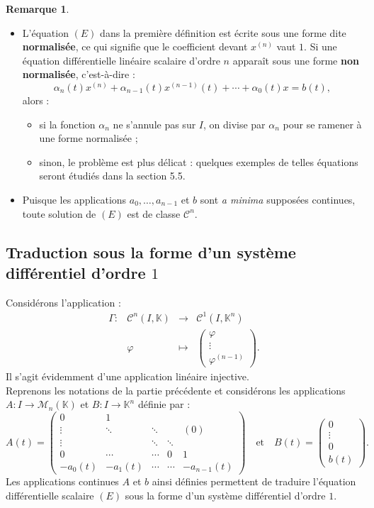 \documentclass[french]{article}
\newcommand{\K}{\mathbb{K}}
\theoremstyle{plain}
\theoremstyle{definition}
\newtheorem*{rmq}{Remarque}
\theoremstyle{remark}
\begin{document}
\begin{rmq}
	\begin{itemize}
		\item L'équation $(E)$ dans la première définition est écrite sous une forme dite \textbf{normalisée}, ce qui signifie que le coefficient devant $x^{(n)}$ vaut $1$. Si une équation différentielle linéaire scalaire d'ordre $n$ apparaît sous une forme \textbf{non normalisée}, c'est-à-dire :
		$$\alpha_n(t)x^{(n)}+\alpha_{n-1}(t)x^{(n-1)}(t)+\cdots+\alpha_0(t)x=b(t),$$
		alors :
		\begin{itemize}[label=$\star$]
			\item si la fonction $\alpha_n$ ne s'annule pas sur $I$, on divise par $\alpha_n$ pour se ramener à une forme normalisée ;
			\item sinon, le problème est plus délicat : quelques exemples de telles équations seront étudiés dans la section 5.5.
		\end{itemize}
		\item Puisque les applications $a_0,\ldots,a_{n-1}$ et $b$ sont \textit{a minima} supposées continues, toute solution de $(E)$ est de classe $\mathcal{C}^n$.
	\end{itemize}
\end{rmq}

\subsection{Traduction sous la forme d'un système différentiel d'ordre $1$}

Considérons l'application :
$$\begin{array}{lrcl}
	\Gamma:&\mathcal{C}^n(I,\K)&\longrightarrow&\mathcal{C}^1(I,\K^n)\\
	&\varphi&\longmapsto&\displaystyle\begin{pmatrix}
		\varphi\\
		\vdots\\
		\varphi^{(n-1)}
	\end{pmatrix}.
\end{array}$$
Il s'agit évidemment d'une application linéaire injective.\\
Reprenons les notations de la partie précédente et considérons les applications $A:I\to\mathcal{M}_n(\K)$ et $B:I\to\K^n$ définie par :
$$A(t)=\begin{pmatrix}
	0&1&&&\\
	\vdots&\ddots&\ddots&&(0)\\
	\vdots&&\ddots&\ddots&\\
	0&\cdots&\cdots&0&1\\
	-a_0(t)&-a_1(t)&\cdots&\cdots&-a_{n-1}(t)
\end{pmatrix}\quad\text{et}\quad B(t)=\begin{pmatrix}
0\\
\vdots\\
0\\
b(t)
\end{pmatrix}.$$
Les applications continues $A$ et $b$ ainsi définies permettent de traduire l'équation différentielle scalaire $(E)$ sous la forme d'un système différentiel d'ordre $1$.
\end{document}

